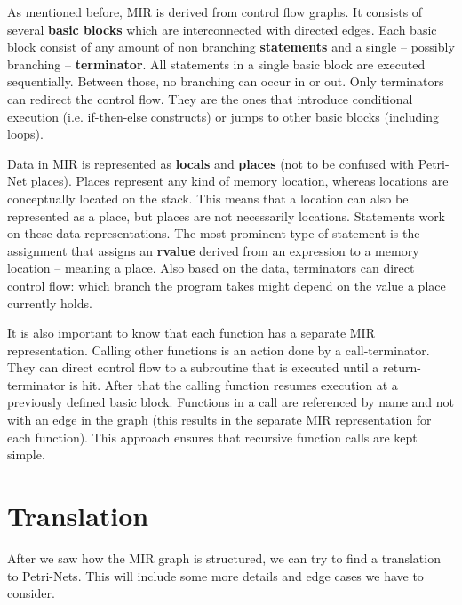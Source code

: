 As mentioned before, MIR is derived from control flow graphs\cite[chapter 2.17]{rustc-guide}.
It consists of several \textbf{basic blocks} which are interconnected with directed edges.
Each basic block consist of any amount of non branching \textbf{statements} and a single -- possibly branching -- \textbf{terminator}.
All statements in a single basic block are executed sequentially.
Between those, no branching can occur in or out.
Only terminators can redirect the control flow.
They are the ones that introduce conditional execution (i.e. if-then-else constructs) or jumps to other basic blocks (including loops).

Data in MIR is represented as \textbf{locals} and \textbf{places} (not to be confused with Petri-Net places).
Places represent any kind of memory location, whereas locations are conceptually located on the stack.
This means that a location can also be represented as a place, but places are not necessarily locations.
Statements work on these data representations.
The most prominent type of statement is the assignment that assigns an \textbf{rvalue} derived from an expression to a memory location -- meaning a place.
Also based on the data, terminators can direct control flow:
which branch the program takes might depend on the value a place currently holds.

It is also important to know that each function has a separate MIR representation.
Calling other functions is an action done by a call-terminator.
They can direct control flow to a subroutine that is executed until a return-terminator is hit.
After that the calling function resumes execution at a previously defined basic block.
Functions in a call are referenced by name and not with an edge in the graph (this results in the separate MIR representation for each function).
This approach ensures that recursive function calls are kept simple.

\section{Translation}
\label{app_trans}
After we saw how the MIR graph is structured, we can try to find a translation to Petri-Nets. This will include some more details and edge cases we have to consider.


